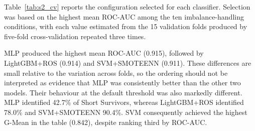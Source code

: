 Table~\ref{tab:s2_cv} reports the configuration selected for each classifier. Selection was based on the highest mean ROC-AUC among the ten imbalance-handling conditions, with each value estimated from the 15 validation folds produced by five-fold cross-validation repeated three times.
\clearpage
\begin{table}[ht!]
  \centering
  \caption[Selected cross-validation configuration per classifier (Study II)]{Selected configuration for each classifier after Optuna optimisation of all 70 classifier--imbalance combinations. ROC-AUC is reported as mean $\pm$ standard deviation across the 15 validation folds. Sensitivity is the recall of Short Survivors, whereas specificity is the recall of Standard Survival patients. G-Mean is calculated within each fold as $\sqrt{\text{Sensitivity} \times \text{Specificity}}$ and then averaged; it therefore need not equal the value obtained from the two displayed column means.}
  \label{tab:s2_cv}
\end{table}

MLP produced the highest mean ROC-AUC (0.915), followed by LightGBM+ROS (0.914) and SVM+SMOTEENN (0.911). These differences are small relative to the variation across folds, so the ordering should not be interpreted as evidence that MLP was consistently better than the other two models. Their behaviour at the default threshold was also markedly different. MLP identified 42.7\% of Short Survivors, whereas LightGBM+ROS identified 78.0\% and SVM+SMOTEENN 90.4\%. SVM consequently achieved the highest G-Mean in the table (0.842), despite ranking third by ROC-AUC.

